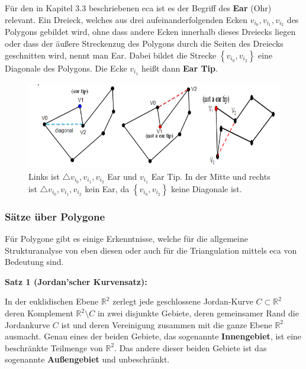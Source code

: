 Für den in Kapitel 3.3 beschriebenen \ac{eca} ist es der Begriff des \textbf{Ear} (Ohr) relevant. 
Ein Dreieck, welches aus drei aufeinanderfolgenden Ecken $v_{i_0}, v_{i_1}, v_{i_2}$ des Polygons gebildet wird, ohne dass andere Ecken innerhalb 
dieses Dreiecks liegen oder dass der äußere Streckenzug des Polygons durch die Seiten des Dreiecks geschnitten wird, nennt man Ear. Dabei bildet die 
Strecke $\left\{v_{i_0}, v_{i_2}\right\}$ eine Diagonale des Polygons. Die Ecke $v_{i_1}$ heißt dann \textbf{Ear Tip}.\cite{meister}

\begin{figure}[h]
  \centering
  \includegraphics[width=1\textwidth]{bilder/eartips.PNG}
  \caption[Beispiele für Ear und Ear Tips in Polygonen]{\centering Links ist  $\triangle v_{i_0}, v_{i_1}, v_{i_2}$ Ear und $v_{i_1}$ Ear Tip. In der Mitte und rechts 
  ist $\triangle v_{i_0}, v_{i_1}, v_{i_2}$ kein Ear, da $\left\{v_{i_0}, v_{i_2}\right\}$ keine Diagonale ist. \cite{newAlg}}
  \label{fig:ear_eartip}
\end{figure}

\subsubsection{Sätze über Polygone}

Für Polygone gibt es einige Erkenntnisse, welche für die allgemeine Strukturanalyse von eben diesen oder auch für die Triangulation mittels 
\ac{eca} von Bedeutung sind. \break

\begin{flushleft}
  { \textbf{Satz 1 (Jordan'scher Kurvensatz):}

In der euklidischen Ebene $\mathbb{R}^2$ zerlegt jede geschlossene Jordan-Kurve $C \subset \mathbb{R}^2 $ deren Komplement $\mathbb{R}^2 \setminus C$ 
in zwei disjunkte Gebiete, deren gemeinsamer Rand die Jordankurve $C$ ist und deren Vereinigung zusammen mit die ganze Ebene $\mathbb{R}^2$ ausmacht.
\linebreak Genau eines der beiden Gebiete, das sogenannte \textbf{Innengebiet}, ist eine beschränkte Teilmenge von $\mathbb{R}^2$.
\linebreak Das andere dieser beiden Gebiete ist das sogenannte \textbf{Außengebiet} und unbeschränkt. \cite{jordan}
}
\end{flushleft}

